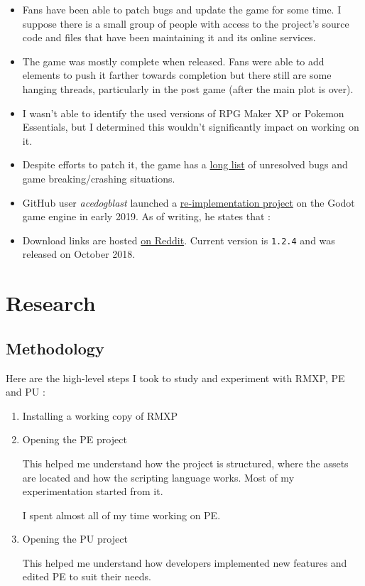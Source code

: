 \documentclass[11pt]{article}
\begin{document}
\begin{itemize}
	\item Fans have been able to patch bugs and update the game for some time. I suppose there is a small group of people with access to the project's source code and files that have been maintaining it and its online services.
	
	\item The game was mostly complete when released. Fans were able to add elements to push it farther towards completion but there still are some hanging threads, particularly in the post game (after the main plot is over).
	
	\item I wasn't able to identify the used versions of RPG Maker XP or Pokemon Essentials, but I determined this wouldn't significantly impact on working on it.
	
	\item Despite efforts to patch it, the game has a \href{https://pokemon-uranium.fandom.com/wiki/Bugs_and_Errors}{long list} of unresolved bugs and game breaking/crashing situations.
	
	\item GitHub user \textit{acedogblast} launched a \href{https://github.com/acedogblast/Project-Uranium-Godot}{re-implementation project} on the Godot game engine in early 2019. As of writing, he states that :
	
	\item Download links are hosted \href{https://www.reddit.com/r/pokemonuranium/comments/a0cw0i/download_links/}{on Reddit}. Current version is \verb|1.2.4| and was released on October  2018.
\end{itemize}


\newpage
\section{Research}

\subsection{Methodology}

Here are the high-level steps I took to study and experiment with RMXP, PE and PU :
\begin{enumerate}
	\item Installing a working copy of RMXP

	\item Opening the PE project
	
	This helped me understand how the project is structured, where the assets are located and how the scripting language works. Most of my experimentation started from it.
	
	I spent almost all of my time working on PE.
	
	\item Opening the PU project
	
	This helped me understand how developers implemented new features and edited PE to suit their needs.
\end{enumerate}
\end{document}
